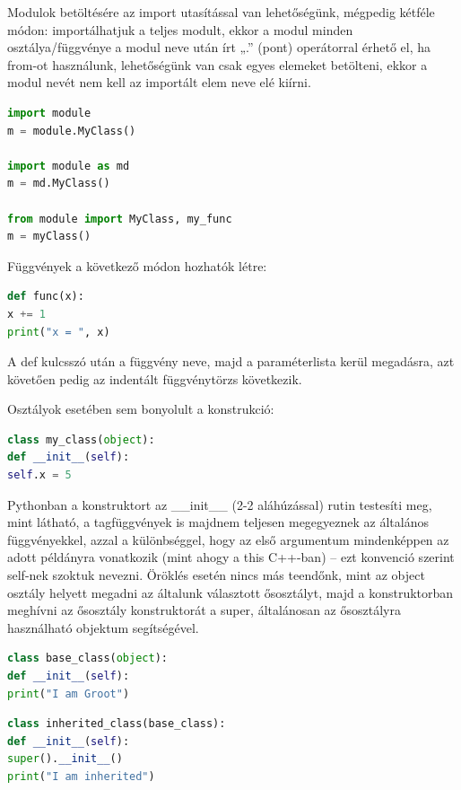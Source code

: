 \documentclass[12pt,a4paper,oneside]{report}             %
\begin{document}
Modulok betöltésére az import utasítással van lehetőségünk, mégpedig kétféle módon: importálhatjuk a teljes modult, ekkor a modul minden osztálya/függvénye a modul neve után írt „.” (pont) operátorral érhető el, ha from-ot használunk, lehetőségünk van csak egyes elemeket betölteni, ekkor a modul nevét nem kell az importált elem neve elé kiírni.

\begin{lstlisting}[language=Python]
import module
m = module.MyClass()

import module as md
m = md.MyClass()

from module import MyClass, my_func
m = myClass()
\end{lstlisting}

Függvények a következő módon hozhatók létre:

\begin{lstlisting}[language=Python]
def func(x):
x += 1
print("x = ", x)
\end{lstlisting}

A def kulcsszó után a függvény neve, majd a paraméterlista kerül megadásra, azt követően pedig az indentált függvénytörzs következik.

Osztályok esetében sem bonyolult a konstrukció:

\begin{lstlisting}[language=Python]
class my_class(object):
def __init__(self):
self.x = 5
\end{lstlisting}

Pythonban a konstruktort az \_\_init\_\_ (2-2 aláhúzással) rutin testesíti meg, mint látható, a tagfüggvények is majdnem teljesen megegyeznek az általános függvényekkel, azzal a különbséggel, hogy az első argumentum mindenképpen az adott példányra vonatkozik (mint ahogy a this C++-ban) – ezt konvenció szerint self-nek szoktuk nevezni.
Öröklés esetén nincs más teendőnk, mint az object osztály helyett megadni az általunk választott ősosztályt, majd a konstruktorban meghívni az ősosztály konstruktorát a super, általánosan az ősosztályra használható objektum segítségével.

\begin{lstlisting}[language=Python]
class base_class(object):
def __init__(self):
print("I am Groot")
\end{lstlisting}

\begin{lstlisting}[language=Python]
class inherited_class(base_class):
def __init__(self):
super().__init__()
print("I am inherited")
\end{lstlisting}
\end{document}
